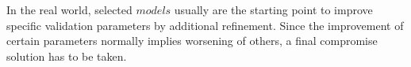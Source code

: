 In the real world, selected $models$ usually are the starting point to improve specific validation parameters by additional refinement. Since the improvement of certain parameters normally implies worsening of others, a final compromise solution has to be taken.\\

